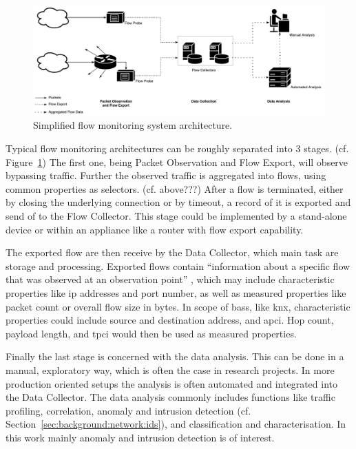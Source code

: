 
\begin{figure}
	\centering
	\includegraphics[width=\textwidth]{figures/200-netflow-architecture.pdf}
	\caption[Simplified flow monitoring system architecture]{Simplified flow monitoring system architecture. \parencite[cf.][]{Hofstede2014} }
	\label{fig:background:network:netflow:architecture}
\end{figure}

Typical flow monitoring architectures can be roughly separated into 3 stages. (cf. Figure~\ref{fig:background:network:netflow:architecture})
The first one, being Packet Observation and Flow Export, will observe bypassing traffic. Further the observed traffic is aggregated into flows, using common properties as selectors. (cf. above\alert{???}) After a flow is terminated, either by closing the underlying connection or by timeout, a record of it is exported and send of to the Flow Collector.
This stage could be implemented by a stand-alone device or within an appliance like a router with flow export capability. \parencite[cf.][]{Hofstede2014}

The exported flow are then receive by the Data Collector, which main task are storage and processing.
Exported flows contain \enquote{information about a specific flow that was observed at an observation point} \parencite{Claise2013}, which may include characteristic properties like \gls{ip} addresses and port number, as well as measured properties like packet count or overall flow size in bytes. \parencite[cf.][]{Hofstede2014}
In scope of \glspl{bas}, like \gls{knx}, characteristic properties could include source and destination address, and \gls{apci}. Hop count, payload length, and \gls{tpci} would then be used as measured properties.

Finally the last stage is concerned with the data analysis. This can be done in a manual, exploratory way, which is often the case in research projects. In more production oriented setups the analysis is often automated and integrated into the Data Collector.
The data analysis commonly includes functions like traffic profiling, correlation, anomaly and intrusion detection (cf. Section~\ref{sec:background:network:ids}), and classification and characterisation. \parencite[cf.][]{Hofstede2014}
In this work mainly anomaly and intrusion detection is of interest.

